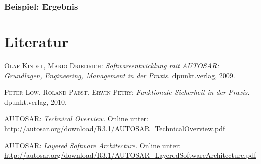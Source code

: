 \documentclass[]{beamer}
\begin{document}
\begin{frame}
\frametitle{Beispiel: Ergebnis}

\end{frame}









\appendix
\section*{Literatur}
\label{sec:Literatur}

\begin{frame}


\begin{thebibliography}{10}

 \textsc{Olaf Kindel, Mario Driedrich}: {\em Softwareentwicklung mit AUTOSAR: Grundlagen, Engineering, Management in der Praxis.} dpunkt.verlag, 2009.

 \textsc{Peter Löw, Roland Pabst, Erwin Petry}: {\em Funktionale Sicherheit in der Praxis.} dpunkt.verlag, 2010.

 \textsc{AUTOSAR}: {\em Technical Overview.} Online unter: \url{http://autosar.org/download/R3.1/AUTOSAR_TechnicalOverview.pdf}

 \textsc{AUTOSAR}: {\em Layered Software Architecture.} Online unter: \url{http://autosar.org/download/R3.1/AUTOSAR_LayeredSoftwareArchitecture.pdf}

\end{thebibliography}


\end{frame}
\end{document}
